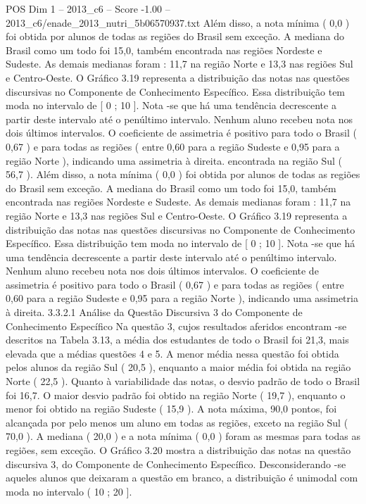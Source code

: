 \begin{textsample}{POS Dim 1 – 2013\_c6 – Score -1.00 – 2013\_c6/enade\_2013\_nutri\_5b06570937.txt}
Além disso, a nota mínima ( 0,0 ) foi obtida por alunos de todas as regiões do Brasil sem exceção.
A mediana do Brasil como um todo foi 15,0, também encontrada nas regiões Nordeste e Sudeste.
As demais medianas foram : 11,7 na região Norte e 13,3 nas regiões Sul e Centro-Oeste.
O Gráfico 3.19 representa a distribuição das notas nas questões discursivas no Componente de Conhecimento Específico.
Essa distribuição tem moda no intervalo de [ 0 ; 10 ].
Nota -se que há uma tendência decrescente a partir deste intervalo até o penúltimo intervalo.
Nenhum aluno recebeu nota nos dois últimos intervalos.
O coeficiente de assimetria é positivo para todo o Brasil ( 0,67 ) e para todas as regiões ( entre 0,60 para a região Sudeste e 0,95 para a região Norte ), indicando uma assimetria à direita. encontrada na região Sul ( 56,7 ).
Além disso, a nota mínima ( 0,0 ) foi obtida por alunos de todas as regiões do Brasil sem exceção.
A mediana do Brasil como um todo foi 15,0, também encontrada nas regiões Nordeste e Sudeste.
As demais medianas foram : 11,7 na região Norte e 13,3 nas regiões Sul e Centro-Oeste.
O Gráfico 3.19 representa a distribuição das notas nas questões discursivas no Componente de Conhecimento Específico.
Essa distribuição tem moda no intervalo de [ 0 ; 10 ].
Nota -se que há uma tendência decrescente a partir deste intervalo até o penúltimo intervalo.
Nenhum aluno recebeu nota nos dois últimos intervalos.
O coeficiente de assimetria é positivo para todo o Brasil ( 0,67 ) e para todas as regiões ( entre 0,60 para a região Sudeste e 0,95 para a região Norte ), indicando uma assimetria à direita. 3.3.2.1 Análise da Questão Discursiva 3 do Componente de Conhecimento Específico Na questão 3, cujos resultados aferidos encontram -se descritos na Tabela 3.13, a média dos estudantes de todo o Brasil foi 21,3, mais elevada que a médias questões 4 e 5.
A menor média nessa questão foi obtida pelos alunos da região Sul ( 20,5 ), enquanto a maior média foi obtida na região Norte ( 22,5 ).
Quanto à variabilidade das notas, o desvio padrão de todo o Brasil foi 16,7.
O maior desvio padrão foi obtido na região Norte ( 19,7 ), enquanto o menor foi obtido na região Sudeste ( 15,9 ).
A nota máxima, 90,0 pontos, foi alcançada por pelo menos um aluno em todas as regiões, exceto na região Sul ( 70,0 ).
A mediana ( 20,0 ) e a nota mínima ( 0,0 ) foram as mesmas para todas as regiões, sem exceção.
O Gráfico 3.20 mostra a distribuição das notas na questão discursiva 3, do Componente de Conhecimento Específico.
Desconsiderando -se aqueles alunos que deixaram a questão em branco, a distribuição é unimodal com moda no intervalo ( 10 ; 20 ].

\end{textsample}
